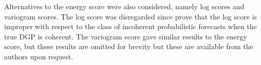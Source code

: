 \documentclass[graybox]{svmult}
\begin{document}
Alternatives to the energy score were also considered, namely log scores and variogram scores. The log score was disregarded since \citet{GamEtAl2018} prove that the log score is improper with respect to the class of incoherent probabilistic forecasts when the true DGP is coherent. The variogram score gave similar results to the energy score, but these results are omitted for brevity but these are available from the authors upon request.

%
%
%
%
%
%
%
\end{document}
